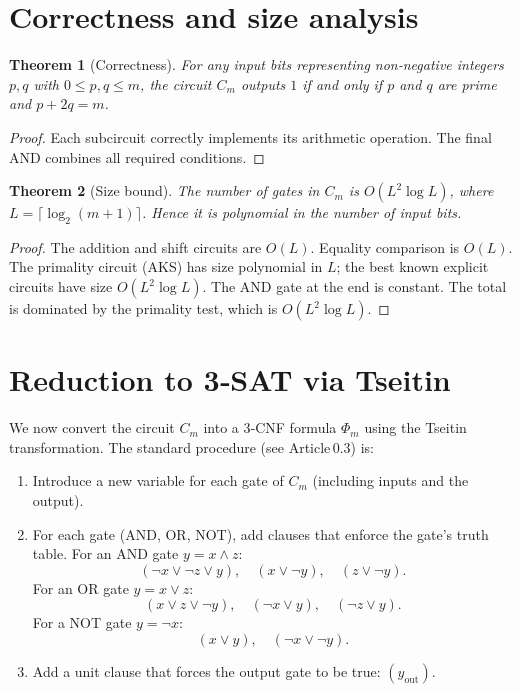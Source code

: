 \documentclass[11pt,a4paper]{article}
\newtheorem{theorem}{Theorem}[section]
\begin{document}
\section{Correctness and size analysis}

\begin{theorem}[Correctness]\label{thm:correct}
For any input bits representing non‑negative integers \(p,q\) with \(0\le p,q \le m\), the circuit \(C_m\) outputs \(1\) if and only if \(p\) and \(q\) are prime and \(p+2q = m\).
\end{theorem}
\begin{proof}
Each subcircuit correctly implements its arithmetic operation. The final AND combines all required conditions.
\end{proof}

\begin{theorem}[Size bound]\label{thm:size}
The number of gates in \(C_m\) is \(O(L^2 \log L)\), where \(L = \lceil \log_2(m+1)\rceil\). Hence it is polynomial in the number of input bits.
\end{theorem}
\begin{proof}
The addition and shift circuits are \(O(L)\). Equality comparison is \(O(L)\). The primality circuit (AKS) has size polynomial in \(L\); the best known explicit circuits have size \(O(L^2 \log L)\). The AND gate at the end is constant. The total is dominated by the primality test, which is \(O(L^2 \log L)\).
\end{proof}

\section{Reduction to 3‑SAT via Tseitin}

We now convert the circuit \(C_m\) into a 3‑CNF formula \(\Phi_m\) using the Tseitin transformation. The standard procedure (see Article 0.3) is:

\begin{enumerate}
\item Introduce a new variable for each gate of \(C_m\) (including inputs and the output).
\item For each gate (AND, OR, NOT), add clauses that enforce the gate’s truth table. For an AND gate \(y = x \land z\):
   \[
   (\neg x \lor \neg z \lor y),\quad (x \lor \neg y),\quad (z \lor \neg y).
   \]
   For an OR gate \(y = x \lor z\):
   \[
   (x \lor z \lor \neg y),\quad (\neg x \lor y),\quad (\neg z \lor y).
   \]
   For a NOT gate \(y = \neg x\):
   \[
   (x \lor y),\quad (\neg x \lor \neg y).
   \]
\item Add a unit clause that forces the output gate to be true: \((y_{\text{out}})\).
\end{enumerate}
\end{document}
